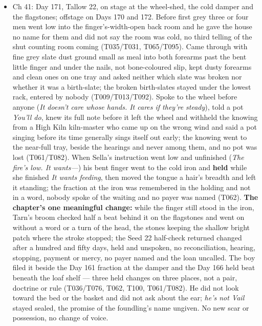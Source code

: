 \documentclass{design/chronicle}
\begin{document}
{\begin{itemize}[leftmargin=1.4em,itemsep=1pt,topsep=3pt,parsep=0pt]
\item Ch 41: Day 171, Tallow 22, on stage at the wheel-shed, the cold damper and the flagstones; offstage on Days 170 and 172. Before first grey three or four men went low into the finger’s-width-open back room and he gave the house no name for them and did not say the room was cold, no third telling of the shut counting room coming (T035/T031, T065/T095). Came through with fine grey slate dust ground small as meal into both forearms past the bent little finger and under the nails, not bone-coloured slip, kept dusty forearms and clean ones on one tray and asked neither which slate was broken nor whether it was a birth-slate; the broken birth-slates stayed under the lowest rack, entered by nobody (T009/T013/T092). Spoke to the wheel before anyone (\emph{It doesn’t care whose hands. It cares if they’re steady}), told a pot \emph{You’ll do}, knew its full note before it left the wheel and withheld the knowing from a High Kiln kiln-master who came up on the wrong wind and said a pot singing before its time generally sings itself out early; the knowing went to the near-full tray, beside the hearings and never among them, and no pot was lost (T061/T082). When Sella’s instruction went low and unfinished (\emph{The fire’s low. It wants---}) his bent finger went to the cold iron and \textbf{held} while she finished \emph{It wants feeding}, then moved the tongue a hair’s breadth and left it standing; the fraction at the iron was remembered in the holding and not in a word, nobody spoke of the waiting and no payer was named (T062). \textbf{The chapter’s one meaningful change:} while the finger still stood in the iron, Tarn’s broom checked half a beat behind it on the flagstones and went on without a word or a turn of the head, the stones keeping the shallow bright patch where the stroke stopped; the Seed 22 half-check returned changed after a hundred and fifty days, held and unspoken, no reconciliation, hearing, stopping, payment or mercy, no payer named and the loan uncalled. The boy filed it beside the Day 161 fraction at the damper and the Day 166 held beat beneath the loaf shelf — three held changes on three places, not a pair, doctrine or rule (T036/T076, T062, T100, T061/T082). He did not look toward the bed or the basket and did not ask about the ear; \emph{he’s not Vail} stayed sealed, the promise of the foundling’s name ungiven. No new scar or possession, no change of voice.

\end{itemize}
}
\end{document}
